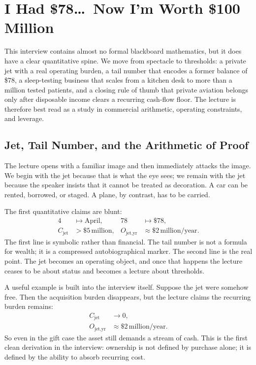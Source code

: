\chapter{I Had \$78\ldots\ Now I'm Worth \$100 Million}

This interview contains almost no formal blackboard mathematics, but it does have a clear quantitative spine. We move from spectacle to thresholds: a private jet with a real operating burden, a tail number that encodes a former balance of \$78, a sleep-testing business that scales from a kitchen desk to more than a million tested patients, and a closing rule of thumb that private aviation belongs only after disposable income clears a recurring cash-flow floor. The lecture is therefore best read as a study in commercial arithmetic, operating constraints, and leverage.

\section{Jet, Tail Number, and the Arithmetic of Proof}

The lecture opens with a familiar image and then immediately attacks the image. We begin with the jet because that is what the eye sees; we remain with the jet because the speaker insists that it cannot be treated as decoration. A car can be rented, borrowed, or staged. A plane, by contrast, has to be carried.

The first quantitative claims are blunt:
\begin{align}
4 &\mapsto \text{April}, &
78 &\mapsto \$78, \\
C_{\text{jet}} &> \$5\,\text{million}, &
O_{\text{jet,yr}} &\approx \$2\,\text{million/year}.
\end{align}
The first line is symbolic rather than financial. The tail number is not a formula for wealth; it is a compressed autobiographical marker. The second line is the real point. The jet becomes an operating object, and once that happens the lecture ceases to be about status and becomes a lecture about thresholds.

A useful example is built into the interview itself. Suppose the jet were somehow free. Then the acquisition burden disappears, but the lecture claims the recurring burden remains:
\begin{align}
C_{\text{jet}} &\to 0, \\
O_{\text{jet,yr}} &\approx \$2\,\text{million/year}.
\end{align}
So even in the gift case the asset still demands a stream of cash. This is the first clean derivation in the interview: ownership is not defined by purchase alone; it is defined by the ability to absorb recurring cost.

